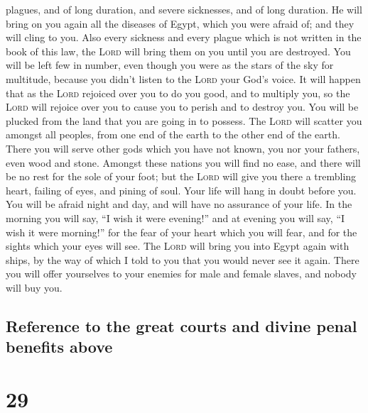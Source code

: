 plagues, and of long duration, and severe sicknesses, and of long
duration.  He will bring on you again all the diseases of
Egypt, which you were afraid of; and they will cling to you.
 Also every sickness and every plague which is not
written in the book of this law, the \textsc{Lord} will bring them on
you until you are destroyed.  You will be left few in
number, even though you were as the stars of the sky for multitude,
because you didn't listen to the \textsc{Lord} your God's voice.
 It will happen that as the \textsc{Lord} rejoiced over
you to do you good, and to multiply you, so the \textsc{Lord} will
rejoice over you to cause you to perish and to destroy you. You will be
plucked from the land that you are going in to possess. 
The \textsc{Lord} will scatter you amongst all peoples, from one end of
the earth to the other end of the earth. There you will serve other gods
which you have not known, you nor your fathers, even wood and stone.
 Amongst these nations you will find no ease, and there
will be no rest for the sole of your foot; but the \textsc{Lord} will
give you there a trembling heart, failing of eyes, and pining of soul.
 Your life will hang in doubt before you. You will be
afraid night and day, and will have no assurance of your life.
 In the morning you will say, ``I wish it were evening!''
and at evening you will say, ``I wish it were morning!'' for the fear of
your heart which you will fear, and for the sights which your eyes will
see.  The \textsc{Lord} will bring you into Egypt again
with ships, by the way of which I told to you that you would never see
it again. There you will offer yourselves to your enemies for male and
female slaves, and nobody will buy you.

\hypertarget{reference-to-the-great-courts-and-divine-penal-benefits-above}{%
\subsection{Reference to the great courts and divine penal benefits
above}\label{reference-to-the-great-courts-and-divine-penal-benefits-above}}

\hypertarget{section-28}{%
\section{29}\label{section-28}}

